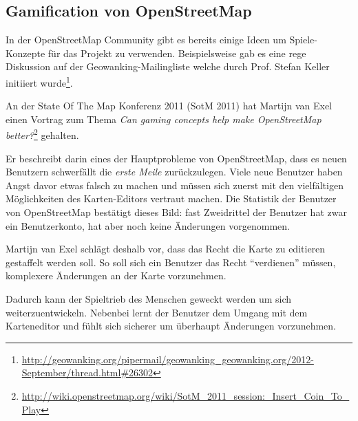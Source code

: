 \subsection{Gamification von OpenStreetMap}
In der OpenStreetMap Community gibt es bereits einige Ideen um Spiele-Konzepte für das Projekt zu verwenden.
Beispielsweise gab es eine rege Diskussion auf der Geowanking-Mailingliste welche durch Prof. Stefan Keller initiiert wurde\footnote{\url{http://geowanking.org/pipermail/geowanking_geowanking.org/2012-September/thread.html\#26302}}.

An der State Of The Map Konferenz 2011 (SotM 2011) hat Martijn van Exel  einen Vortrag zum Thema \emph{Can gaming concepts help make OpenStreetMap better?}\footnote{\url{http://wiki.openstreetmap.org/wiki/SotM_2011_session:_Insert_Coin_To_Play}} gehalten.

Er beschreibt darin eines der Hauptprobleme von OpenStreetMap, dass es neuen Benutzern schwerfällt die \emph{erste Meile} zurückzulegen.
Viele neue Benutzer haben Angst davor etwas falsch zu machen und müssen sich zuerst mit den vielfältigen Möglichkeiten des Karten-Editors vertraut machen.
Die Statistik der Benutzer von OpenStreetMap bestätigt dieses Bild: fast Zweidrittel der Benutzer hat zwar ein Benutzerkonto, hat aber noch keine Änderungen vorgenommen.

Martijn van Exel schlägt deshalb vor, dass das Recht die Karte zu editieren gestaffelt werden soll.
So soll sich ein Benutzer das Recht "`verdienen"' müssen, komplexere Änderungen an der Karte vorzunehmen.

Dadurch kann der Spieltrieb des Menschen geweckt werden um sich weiterzuentwickeln.
Nebenbei lernt der Benutzer dem Umgang mit dem Karteneditor und fühlt sich sicherer um überhaupt Änderungen vorzunehmen.